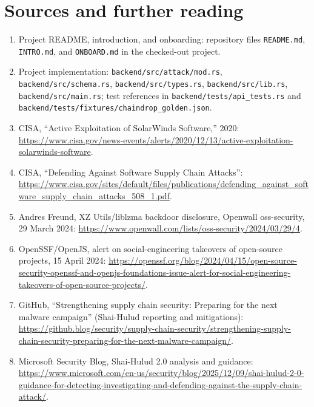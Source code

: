 \documentclass[11pt,oneside]{book}
\newcommand{\code}[1]{\texttt{\small #1}}
\begin{document}
\backmatter
\chapter*{Sources and further reading}
\begin{enumerate}
\item Project README, introduction, and onboarding: repository files \code{README.md}, \code{INTRO.md}, and \code{ONBOARD.md} in the checked-out project.
\item Project implementation: \code{backend/src/attack/mod.rs}, \code{backend/src/schema.rs}, \code{backend/src/types.rs}, \code{backend/src/lib.rs}, \code{backend/src/main.rs}; test references in \code{backend/tests/api\_tests.rs} and \code{backend/tests/fixtures/chaindrop\_golden.json}.
\item CISA, ``Active Exploitation of SolarWinds Software,'' 2020: \url{https://www.cisa.gov/news-events/alerts/2020/12/13/active-exploitation-solarwinds-software}.
\item CISA, ``Defending Against Software Supply Chain Attacks'': \url{https://www.cisa.gov/sites/default/files/publications/defending_against_software_supply_chain_attacks_508_1.pdf}.
\item Andres Freund, XZ Utils/liblzma backdoor disclosure, Openwall oss-security, 29 March 2024: \url{https://www.openwall.com/lists/oss-security/2024/03/29/4}.
\item OpenSSF/OpenJS, alert on social-engineering takeovers of open-source projects, 15 April 2024: \url{https://openssf.org/blog/2024/04/15/open-source-security-openssf-and-openjs-foundations-issue-alert-for-social-engineering-takeovers-of-open-source-projects/}.
\item GitHub, ``Strengthening supply chain security: Preparing for the next malware campaign'' (Shai-Hulud reporting and mitigations): \url{https://github.blog/security/supply-chain-security/strengthening-supply-chain-security-preparing-for-the-next-malware-campaign/}.
\item Microsoft Security Blog, Shai-Hulud 2.0 analysis and guidance: \url{https://www.microsoft.com/en-us/security/blog/2025/12/09/shai-hulud-2-0-guidance-for-detecting-investigating-and-defending-against-the-supply-chain-attack/}.
\end{enumerate}
\end{document}
